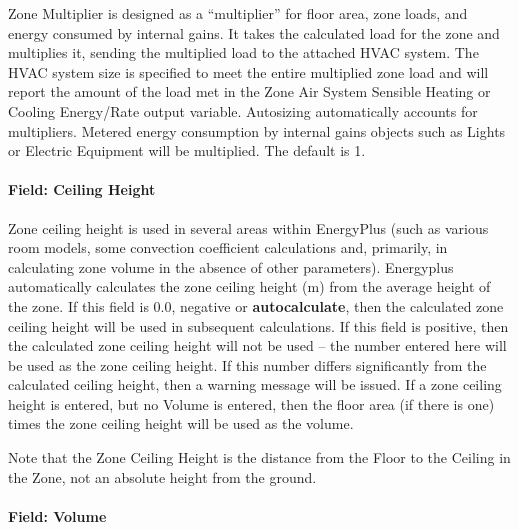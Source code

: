 Zone Multiplier is designed as a ``multiplier'' for floor area, zone loads, and energy consumed by internal gains. It takes the calculated load for the zone and multiplies it, sending the multiplied load to the attached HVAC system. The HVAC system size is specified to meet the entire multiplied zone load and will report the amount of the load met in the Zone Air System Sensible Heating or Cooling Energy/Rate output variable. Autosizing automatically accounts for multipliers. Metered energy consumption by internal gains objects such as Lights or Electric Equipment will be multiplied. The default is 1.

\paragraph{Field: Ceiling Height}\label{field-ceiling-height}

Zone ceiling height is used in several areas within EnergyPlus (such as various room models, some convection coefficient calculations and, primarily, in calculating zone volume in the absence of other parameters). Energyplus automatically calculates the zone ceiling height (m) from the average height of the zone. If this field is 0.0, negative or \textbf{autocalculate}, then the calculated zone ceiling height will be used in subsequent calculations. If this field is positive, then the calculated zone ceiling height will not be used -- the number entered here will be used as the zone ceiling height. If this number differs significantly from the calculated ceiling height, then a warning message will be issued. If a zone ceiling height is entered, but no Volume is entered, then the floor area (if there is one) times the zone ceiling height will be used as the volume.

Note that the Zone Ceiling Height is the distance from the Floor to the Ceiling in the Zone, not an absolute height from the ground.

\paragraph{Field: Volume}\label{field-volume}

